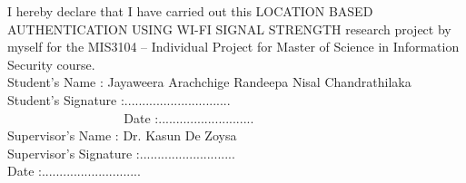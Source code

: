 I hereby declare that I have carried out this LOCATION BASED AUTHENTICATION USING WI-FI SIGNAL STRENGTH research project by myself for the MIS3104 – Individual Project for Master of Science in Information Security course.\\
\newline
\newline
Student's Name : Jayaweera Arachchige Randeepa Nisal Chandrathilaka\\
\newline
Student's Signature :..............................\\
\newline                   
Date :...........................\\
\newline
\newline
Supervisor's Name : Dr. Kasun De Zoysa\\
\newline
Supervisor's Signature :...........................\\
\newline
Date :............................